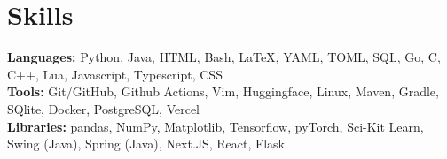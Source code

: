 \documentclass{article}
\begin{document}
\vspace{-10pt}


\section{Skills}
\begin{itemize}[leftmargin=0.15in, label={}]
	\small{\item{

		            \textbf{Languages:}{ Python, Java, HTML, Bash, \LaTeX, YAML, TOML, SQL, Go, C, C++, Lua, Javascript, Typescript, CSS} \\

		            \textbf{Tools:}{ Git/GitHub, Github Actions, Vim, Huggingface, Linux, Maven, Gradle, SQlite, Docker, PostgreSQL, Vercel}\\
		            \textbf{Libraries:}{ pandas, NumPy, Matplotlib, Tensorflow, pyTorch, Sci-Kit Learn, Swing (Java), Spring (Java), Next.JS, React, Flask}

		      }}
\end{itemize}
\vspace{-10pt}


\end{document}
